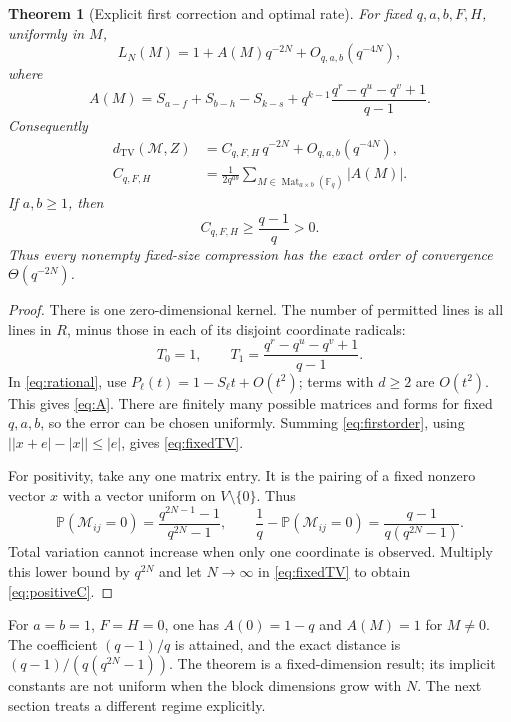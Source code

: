 \documentclass[11pt]{article}
\numberwithin{equation}{section}
\newtheorem{theorem}{Theorem}[section]
\theoremstyle{definition}
\theoremstyle{remark}
\newcommand{\F}{\mathbb F}
\newcommand{\Prob}{\mathbb P}
\newcommand{\TV}{d_{\mathrm{TV}}}
\newcommand{\Mat}{\operatorname{Mat}}
\newcommand{\abs}[1]{\lvert#1\rvert}
\newcommand{\set}[1]{\{#1\}}
\begin{document}
\begin{theorem}[Explicit first correction and optimal rate]\label{thm:fixed}
For fixed $q,a,b,F,H$, uniformly in $M$,
\begin{equation}\label{eq:firstorder}
 L_N(M)=1+A(M)q^{-2N}+O_{q,a,b}(q^{-4N}),
\end{equation}
where
\begin{equation}\label{eq:A}
 A(M)=S_{a-f}+S_{b-h}-S_{k-s}
 +q^{k-1}\frac{q^r-q^u-q^v+1}{q-1}.
\end{equation}
Consequently
\begin{align}
 \TV(\mathcal M,Z)&=C_{q,F,H}\,q^{-2N}+O_{q,a,b}(q^{-4N}),\label{eq:fixedTV}\\
 C_{q,F,H}&=\frac{1}{2q^{ab}}\sum_{M\in\Mat_{a\times b}(\F_q)}\abs{A(M)}.\label{eq:C}
\end{align}
If $a,b\ge1$, then
\begin{equation}\label{eq:positiveC}
 C_{q,F,H}\ge\frac{q-1}{q}>0.
\end{equation}
Thus every nonempty fixed-size compression has the exact order of convergence $\Theta(q^{-2N})$.
\end{theorem}
\begin{proof}
There is one zero-dimensional kernel. The number of permitted lines is all lines in $R$, minus those in each of its disjoint coordinate radicals:
\[
 T_0=1,\qquad T_1=\frac{q^r-q^u-q^v+1}{q-1}.
\]
In \eqref{eq:rational}, use $P_\ell(t)=1-S_\ell t+O(t^2)$; terms with $d\ge2$ are $O(t^2)$. This gives \eqref{eq:A}. There are finitely many possible matrices and forms for fixed $q,a,b$, so the error can be chosen uniformly. Summing \eqref{eq:firstorder}, using $\bigl|\abs{x+e}-\abs x\bigr|\le\abs e$, gives \eqref{eq:fixedTV}.

For positivity, take any one matrix entry. It is the pairing of a fixed nonzero vector $x$ with a vector uniform on $V\setminus\set0$. Thus
\[
 \Prob(\mathcal M_{ij}=0)=\frac{q^{2N-1}-1}{q^{2N}-1},
 \qquad
 \frac1q-\Prob(\mathcal M_{ij}=0)=\frac{q-1}{q(q^{2N}-1)}.
\]
Total variation cannot increase when only one coordinate is observed. Multiply this lower bound by $q^{2N}$ and let $N\to\infty$ in \eqref{eq:fixedTV} to obtain \eqref{eq:positiveC}.
\end{proof}

For $a=b=1$, $F=H=0$, one has $A(0)=1-q$ and $A(M)=1$ for $M\ne0$. The coefficient $(q-1)/q$ is attained, and the exact distance is $(q-1)/(q(q^{2N}-1))$. The theorem is a fixed-dimension result; its implicit constants are not uniform when the block dimensions grow with $N$. The next section treats a different regime explicitly.
\end{document}
